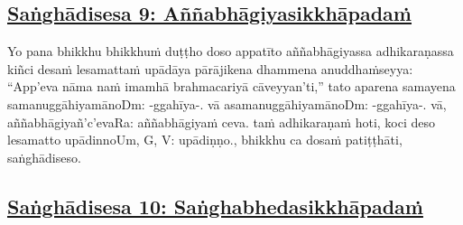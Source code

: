 \subsection*{\hyperref[comm9]{Saṅghādisesa 9: Aññabhāgiyasikkhāpadaṁ}}
\label{sd9}

Yo pana bhikkhu bhikkhuṁ duṭṭho doso appatīto aññabhāgiyassa adhikaraṇassa kiñci desaṁ lesamattaṁ upādāya pārājikena dhammena anuddhaṁseyya: ``App'eva nāma naṁ imamhā brahmacariyā cāveyyan'ti,'' tato aparena samayena samanuggāhiyamāno\makeatletter\hyperlink{endnote-appendix}\makeatother Dm: -ggahīya-.  vā asamanuggāhiyamāno\makeatletter\hyperlink{endnote-appendix}\makeatother Dm: -ggahīya-.  vā, aññabhāgiyañ'c'eva\makeatletter\hyperlink{endnote-appendix}\makeatother Ra: aññabhāgiyaṁ ceva. taṁ adhikaraṇaṁ hoti, koci deso lesamatto upādinno\makeatletter\hyperlink{endnote-appendix}\makeatother Um, G, V: upādiṇṇo., bhikkhu ca dosaṁ patiṭṭhāti, saṅghādiseso.



\subsection*{\hyperref[comm10]{Saṅghādisesa 10: Saṅghabhedasikkhāpadaṁ}}
\label{sd10}

